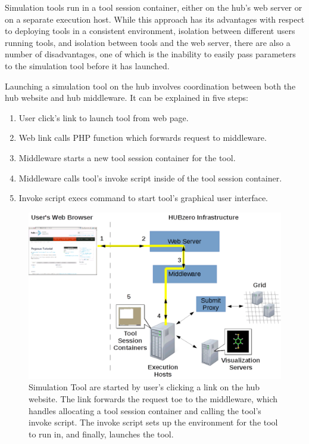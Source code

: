 \documentclass[letterpaper]{scrartcl}
\begin{document}
Simulation tools run in a tool session container, either on the hub's web server
or on a separate execution host. While this approach has its advantages with
respect to deploying tools in a consistent environment, isolation between
different users running tools, and isolation between tools and the web server,
there are also a number of disadvantages, one of which is the inability to
easily pass parameters to the simulation tool before it has launched.

Launching a simulation tool on the hub involves coordination between both the
hub website and hub middleware. It can be explained in five steps:

\begin{enumerate}
\item User click's link to launch tool from web page.
\item Web link calls PHP function which forwards request to middleware.
\item Middleware starts a new tool session container for the tool.
\item Middleware calls tool's invoke script inside of the tool session container.
\item Invoke script execs command to start tool's graphical user interface.
\end{enumerate}

\begin{figure}[ht]
  \centering
  \includegraphics[width=\textwidth]
    {../../images/eps/start+tool+session+container+diagram2.pdf}
  \caption{ Simulation Tool are started by user's clicking a link on the hub
            website. The link forwards the request toe to the middleware, which
            handles allocating a tool session container and calling the tool's
            invoke script. The invoke script sets up the environment for the
            tool to run in, and finally, launches the tool.}
  \label{fig:start_tool_session_container_diagram}
\end{figure}
\end{document}
